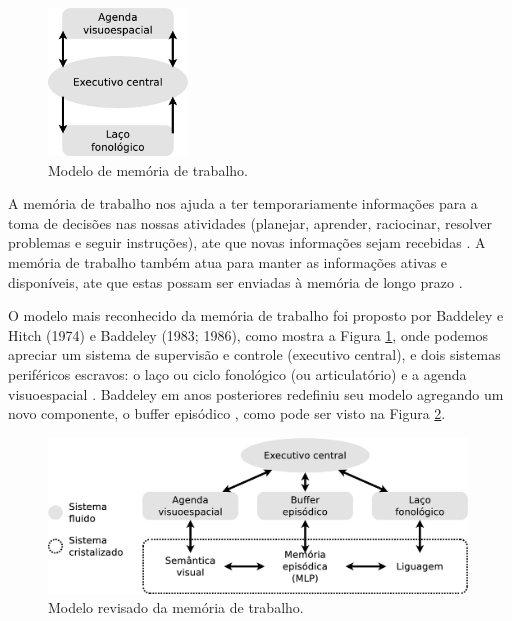 \begin{figure}
  \centering
    \includegraphics[width=0.33\textwidth]{chapters/cap-learning/memory-mcp.eps}
\caption{Modelo de memória de trabalho.}
\label{fig:memory-mcp}
\end{figure}
A memória de trabalho nos ajuda a ter temporariamente informações para a toma de decisões nas
nossas atividades (planejar, aprender, raciocinar, resolver problemas e seguir instruções),
ate que novas informações sejam recebidas 
\cite[pp. 678]{spreen2006compendium} \cite[pp. 266]{braisby2012cognitive}.
A memória de trabalho também atua para manter as informações ativas e disponíveis,
 ate que estas possam ser enviadas à memória de longo prazo
\cite[pp. 678]{spreen2006compendium}.

O modelo mais reconhecido da memória de trabalho foi proposto por Baddeley e Hitch  (1974)
e Baddeley (1983; 1986), como mostra a Figura \ref{fig:memory-mcp},
onde podemos apreciar um sistema de  supervisão e controle (executivo central),
e dois sistemas periféricos escravos:
o laço ou ciclo fonológico (ou articulatório) e a agenda visuoespacial
\cite[pp. 678]{spreen2006compendium} \cite[pp. 266, 272, 273]{braisby2012cognitive}.
Baddeley em anos posteriores redefiniu seu modelo agregando um novo componente, 
o buffer episódico \cite[pp. 284]{braisby2012cognitive} \cite[pp. 678]{spreen2006compendium} \cite[pp. 122]{pake2019psicologia},
como pode ser visto na Figura \ref{fig:memory-working}.
\begin{figure}[!h]
  \centering
    \includegraphics[width=0.99\textwidth]{chapters/cap-learning/memory-working.eps}
\caption{Modelo revisado da memória de trabalho.}
\label{fig:memory-working}
\end{figure}

